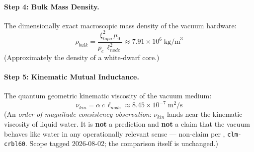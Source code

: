 \paragraph{Step 4: Bulk Mass Density.}
The dimensionally exact macroscopic mass density of the vacuum hardware:
\begin{equation}
    \rho_{bulk}
    = \frac{\xi_{topo}^2\,\mu_0}{p_c\,\ell_{node}^2}
    \approx 7.91 \times 10^{6}\;\text{kg/m}^3
    \label{eq:rho_bulk}
\end{equation}
(Approximately the density of a white-dwarf core.)

\paragraph{Step 5: Kinematic Mutual Inductance.}
The quantum geometric kinematic viscosity of the vacuum medium:
\begin{equation}
    \nu_{kin}
    = \alpha\,c\,\ell_{node}
    \approx 8.45 \times 10^{-7}\;\text{m}^2\text{/s}
    \label{eq:nu_kin}
\end{equation}
(An \emph{order-of-magnitude consistency observation}: $\nu_{kin}$ lands near the kinematic viscosity of liquid water. It is \textbf{not} a prediction and \textbf{not} a claim that the vacuum behaves like water in any operationally relevant sense --- non-claim per , \texttt{clm-crbl60}. Scope tagged 2026-08-02; the comparison itself is unchanged.)

